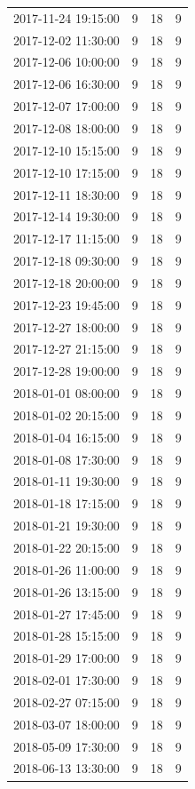 \begin{tabular}{lrrr}
2017-11-24 19:15:00 & 9 & 18 & 9 \\
2017-12-02 11:30:00 & 9 & 18 & 9 \\
2017-12-06 10:00:00 & 9 & 18 & 9 \\
2017-12-06 16:30:00 & 9 & 18 & 9 \\
2017-12-07 17:00:00 & 9 & 18 & 9 \\
2017-12-08 18:00:00 & 9 & 18 & 9 \\
2017-12-10 15:15:00 & 9 & 18 & 9 \\
2017-12-10 17:15:00 & 9 & 18 & 9 \\
2017-12-11 18:30:00 & 9 & 18 & 9 \\
2017-12-14 19:30:00 & 9 & 18 & 9 \\
2017-12-17 11:15:00 & 9 & 18 & 9 \\
2017-12-18 09:30:00 & 9 & 18 & 9 \\
2017-12-18 20:00:00 & 9 & 18 & 9 \\
2017-12-23 19:45:00 & 9 & 18 & 9 \\
2017-12-27 18:00:00 & 9 & 18 & 9 \\
2017-12-27 21:15:00 & 9 & 18 & 9 \\
2017-12-28 19:00:00 & 9 & 18 & 9 \\
2018-01-01 08:00:00 & 9 & 18 & 9 \\
2018-01-02 20:15:00 & 9 & 18 & 9 \\
2018-01-04 16:15:00 & 9 & 18 & 9 \\
2018-01-08 17:30:00 & 9 & 18 & 9 \\
2018-01-11 19:30:00 & 9 & 18 & 9 \\
2018-01-18 17:15:00 & 9 & 18 & 9 \\
2018-01-21 19:30:00 & 9 & 18 & 9 \\
2018-01-22 20:15:00 & 9 & 18 & 9 \\
2018-01-26 11:00:00 & 9 & 18 & 9 \\
2018-01-26 13:15:00 & 9 & 18 & 9 \\
2018-01-27 17:45:00 & 9 & 18 & 9 \\
2018-01-28 15:15:00 & 9 & 18 & 9 \\
2018-01-29 17:00:00 & 9 & 18 & 9 \\
2018-02-01 17:30:00 & 9 & 18 & 9 \\
2018-02-27 07:15:00 & 9 & 18 & 9 \\
2018-03-07 18:00:00 & 9 & 18 & 9 \\
2018-05-09 17:30:00 & 9 & 18 & 9 \\
2018-06-13 13:30:00 & 9 & 18 & 9 \\

\end{tabular}
